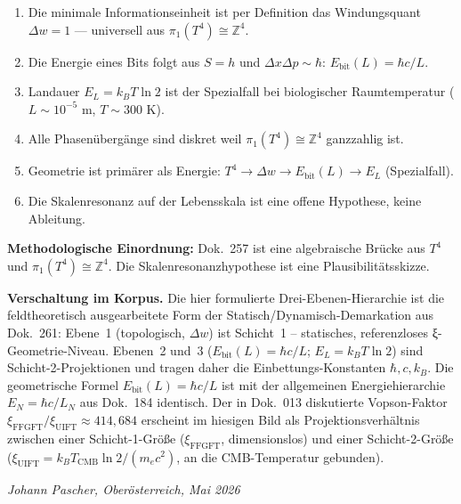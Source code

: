 \begin{enumerate}
  \item Die minimale Informationseinheit ist per Definition das
        Windungsquant \(\Delta w = 1\) —
        universell aus \(\pi_1(T^4) \cong \mathbb{Z}^4\).
  \item Die Energie eines Bits folgt aus \(S = h\) und
        \(\Delta x\Delta p \sim \hbar\):
        \(E_\text{bit}(L) = \hbar c / L\).
  \item Landauer \(E_L = k_BT\ln2\) ist der Spezialfall
        bei biologischer Raumtemperatur (\(L \sim 10^{-5}\) m,
        \(T \sim 300\) K).
  \item Alle Phasenübergänge sind diskret weil
        \(\pi_1(T^4) \cong \mathbb{Z}^4\) ganzzahlig ist.
  \item Geometrie ist primärer als Energie:
        \(T^4 \to \Delta w \to E_\text{bit}(L) \to E_L\) (Spezialfall).
  \item Die Skalenresonanz auf der Lebensskala ist eine offene
        Hypothese, keine Ableitung.
\end{enumerate}

\bigskip
\noindent
\textbf{Methodologische Einordnung:}
Dok.~257 ist eine algebraische Brücke aus \(T^4\) und
\(\pi_1(T^4) \cong \mathbb{Z}^4\).
Die Skalenresonanzhypothese ist eine Plausibilitätsskizze.

\bigskip
\noindent
\textbf{Verschaltung im Korpus.}
Die hier formulierte Drei-Ebenen-Hierarchie ist die feldtheoretisch
ausgearbeitete Form der Statisch/Dynamisch-Demarkation aus Dok.~261:
Ebene~1 (topologisch, \(\Delta w\)) ist Schicht~1 -- statisches,
referenzloses ξ-Geometrie-Niveau. Ebenen~2 und~3
(\(E_\text{bit}(L) = \hbar c/L\); \(E_L = k_B T \ln 2\)) sind
Schicht-2-Projektionen und tragen daher die Einbettungs-Konstanten
\(\hbar, c, k_B\). Die geometrische Formel \(E_\text{bit}(L) = \hbar c/L\)
ist mit der allgemeinen Energiehierarchie \(E_N = \hbar c/L_N\) aus
Dok.~184 identisch. Der in Dok.~013 diskutierte Vopson-Faktor
\(\xi_\text{FFGFT}/\xi_\text{UIFT} \approx 414{,}684\) erscheint im
hiesigen Bild als Projektionsverhältnis zwischen einer Schicht-1-Größe
(\(\xi_\text{FFGFT}\), dimensionslos) und einer Schicht-2-Größe
(\(\xi_\text{UIFT} = k_B T_\text{CMB}\ln 2/(m_e c^2)\), an die
CMB-Temperatur gebunden).

\bigskip
\begin{flushright}
\textit{Johann Pascher, Oberösterreich, Mai 2026}
\end{flushright}

